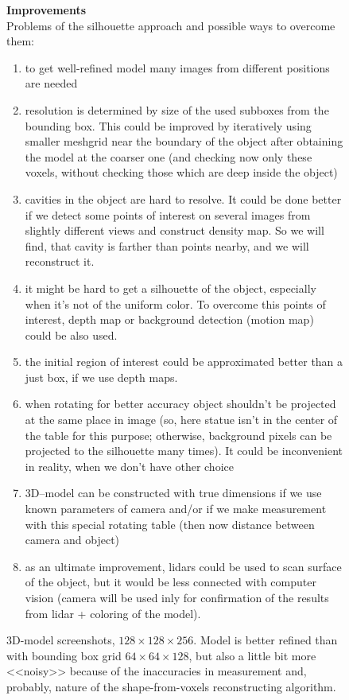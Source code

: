 \documentclass{report}
\begin{document}
\begin{figure}[h]
\begin{center}
		\caption{3D-model screenshots, $128\times128\times256$. Model is better refined than with bounding box grid $64\times64\times128$, but also a little bit more <<noisy>> because of the inaccuracies in measurement and, probably, nature of the shape-from-voxels reconstructing algorithm.}
	\end{center}
\newpage
\textbf{Improvements}\\
Problems of the silhouette approach and possible ways to overcome them:
\begin{enumerate}
	\item to get well-refined model many images from different positions are needed
	\item resolution is determined by size of the used subboxes from the bounding box. This could be improved by iteratively using smaller meshgrid near the boundary of the object after obtaining the model at the coarser one (and checking now only these voxels, without checking those which are deep inside the object) 
	\item cavities in the object are hard to resolve. It could be done better if we detect some points of interest on several images from slightly different views and construct density map. So we will find, that cavity is farther than points nearby, and we will reconstruct it.
	\item it might be hard to get a silhouette of the object, especially when it's not of the uniform color. To overcome this points of interest, depth map or background detection (motion map) could be also used.
	\item the initial region of interest could be approximated better than a just box, if we use depth maps.
	\item when rotating for better accuracy object shouldn't be projected at the same place in image (so, here statue isn't in the center of the table for this purpose; otherwise, background pixels can be projected to the silhouette many times). It could be inconvenient in reality, when we don't have other choice 
	\item 3D--model can be constructed with true dimensions if we use known parameters of camera and/or if we make measurement with this special rotating table (then now distance between camera and object) 
	\item as an ultimate improvement, lidars could be used to scan surface of the object, but it would be less connected with computer vision (camera will be used inly for confirmation of the results from lidar + coloring of the model).
\end{enumerate}
\end{figure}
\end{document}

